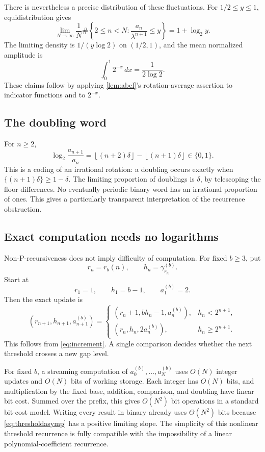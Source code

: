 \documentclass[11pt,letterpaper]{article}
\numberwithin{equation}{section}
\theoremstyle{definition}
\theoremstyle{remark}
\newcommand{\floor}[1]{\left\lfloor#1\right\rfloor}
\begin{document}
There is nevertheless a precise distribution of these fluctuations. For $1/2\le y\le1$, equidistribution gives
\begin{equation}\label{eq:distribution}
 \lim_{N\to\infty}\frac1N\#\left\{2\le n<N:
 \frac{a_n}{\lambda^{n+1}}\le y\right\}=1+\log_2 y.
\end{equation}
The limiting density is $1/(y\log2)$ on $(1/2,1)$, and the mean normalized amplitude is
\[
 \int_0^1 2^{-x}\,dx=\frac1{2\log2}.
\]
These claims follow by applying \cref{lem:abel}'s rotation-average assertion to indicator functions and to $2^{-x}$.

\subsection{The doubling word}
For $n\ge2$,
\[
 \log_2\frac{a_{n+1}}{a_n}
 =\floor{(n+2)\delta}-\floor{(n+1)\delta}\in\{0,1\}.
\]
This is a coding of an irrational rotation: a doubling occurs exactly when $\{(n+1)\delta\}\ge1-\delta$. The limiting proportion of doublings is $\delta$, by telescoping the floor differences. No eventually periodic binary word has an irrational proportion of ones. This gives a particularly transparent interpretation of the recurrence obstruction.

\subsection{Exact computation needs no logarithms}
Non-P-recursiveness does not imply difficulty of computation. For fixed $b\ge3$, put
\[
 r_n=r_b(n),\qquad h_n=\gamma_{r_n}^{(b)}.
\]
Start at
\[
 r_1=1,\qquad h_1=b-1,\qquad a_1^{(b)}=2.
\]
Then the exact update is
\begin{equation}\label{eq:nonlinearrec}
 (r_{n+1},h_{n+1},a_{n+1}^{(b)})=
 \begin{cases}
 (r_n+1,bh_n-1,a_n^{(b)}),&h_n<2^{n+1},\\
 (r_n,h_n,2a_n^{(b)}),&h_n\ge2^{n+1}.
 \end{cases}
\end{equation}
This follows from \eqref{eq:increment}. A single comparison decides whether the next threshold crosses a new gap level.

For fixed $b$, a streaming computation of $a_0^{(b)},\ldots,a_N^{(b)}$ uses $O(N)$ integer updates and $O(N)$ bits of working storage. Each integer has $O(N)$ bits, and multiplication by the fixed base, addition, comparison, and doubling have linear bit cost. Summed over the prefix, this gives $O(N^2)$ bit operations in a standard bit-cost model. Writing every result in binary already uses $\Theta(N^2)$ bits because \eqref{eq:thresholdasymp} has a positive limiting slope. The simplicity of this nonlinear threshold recurrence is fully compatible with the impossibility of a linear polynomial-coefficient recurrence.
\end{document}
